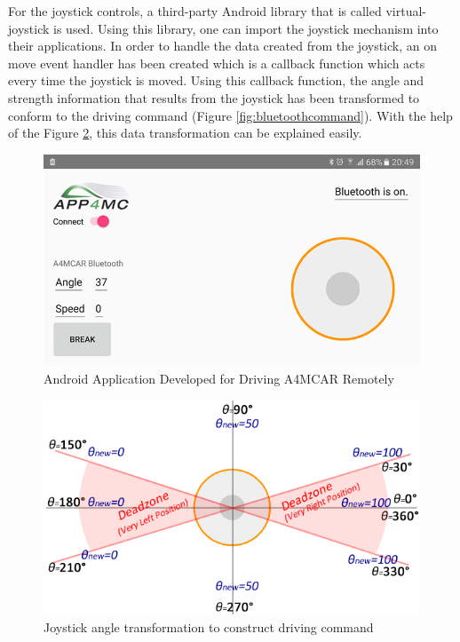 For the joystick controls, a third-party Android library that is called virtual-joystick \cite{virtualjoystick} is used. Using this library, one can import the joystick mechanism into their applications. In order to handle the data created from the joystick, an on move event handler has been created which is a callback function which acts every time the joystick is moved. Using this callback function, the angle and strength information that results from the joystick has been transformed to conform to the driving command (Figure \ref{fig:bluetoothcommand}). With the help of the Figure \ref{fig:joystickpie}, this data transformation can be explained easily.
\begin{figure}[!ht]
	\includegraphics[scale=0.6]{content/images/androidapp.png}
	\caption{Android Application Developed for Driving A4MCAR Remotely}
	\label{fig:androidapp}
\end{figure}
\begin{figure}[!ht]
	\includegraphics[scale=0.6]{content/images/joystickpie.png}
	\caption{Joystick angle transformation to construct driving command}
	\label{fig:joystickpie}
\end{figure}

